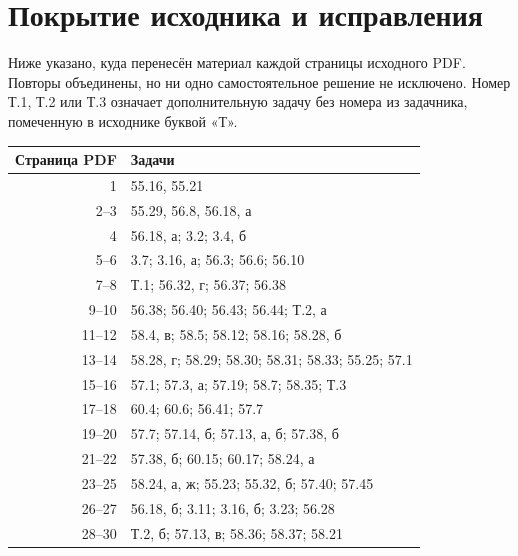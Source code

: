 \section{Покрытие исходника и исправления}
Ниже указано, куда перенесён материал каждой страницы исходного PDF.
Повторы объединены, но ни одно самостоятельное решение не исключено.
Номер Т.1, Т.2 или Т.3 означает дополнительную задачу без номера
из задачника, помеченную в исходнике буквой «Т».
\begin{center}
\begin{tabular}{r|l}
Страница PDF & Задачи\\\hline
1 & 55.16, 55.21\\
2--3 & 55.29, 56.8, 56.18, а\\
4 & 56.18, а; 3.2; 3.4, б\\
5--6 & 3.7; 3.16, а; 56.3; 56.6; 56.10\\
7--8 & Т.1; 56.32, г; 56.37; 56.38\\
9--10 & 56.38; 56.40; 56.43; 56.44; Т.2, а\\
11--12 & 58.4, в; 58.5; 58.12; 58.16; 58.28, б\\
13--14 & 58.28, г; 58.29; 58.30; 58.31; 58.33; 55.25; 57.1\\
15--16 & 57.1; 57.3, а; 57.19; 58.7; 58.35; Т.3\\
17--18 & 60.4; 60.6; 56.41; 57.7\\
19--20 & 57.7; 57.14, б; 57.13, а, б; 57.38, б\\
21--22 & 57.38, б; 60.15; 60.17; 58.24, а\\
23--25 & 58.24, а, ж; 55.23; 55.32, б; 57.40; 57.45\\
26--27 & 56.18, б; 3.11; 3.16, б; 3.23; 56.28\\
28--30 & Т.2, б; 57.13, в; 58.36; 58.37; 58.21
\end{tabular}
\end{center}

